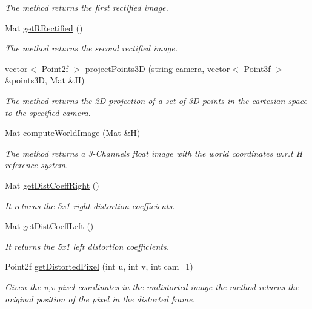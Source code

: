 \begin{DoxyCompactItemize}
\begin{DoxyCompactList}\small\item\em The method returns the first rectified image. \end{DoxyCompactList}\item 
Mat \hyperlink{classStereoCamera_aaf4ba8eaa338ff24db1196849a96e5e9}{get\+R\+Rectified} ()
\begin{DoxyCompactList}\small\item\em The method returns the second rectified image. \end{DoxyCompactList}\item 
vector$<$ Point2f $>$ \hyperlink{classStereoCamera_a03406c9d31c1b765a8d6ef9641222309}{project\+Points3\+D} (string camera, vector$<$ Point3f $>$ \&points3\+D, Mat \&H)
\begin{DoxyCompactList}\small\item\em The method returns the 2\+D projection of a set of 3\+D points in the cartesian space to the specified camera. \end{DoxyCompactList}\item 
Mat \hyperlink{classStereoCamera_a52ef2f3401488e5c4fa6badd1336f96d}{compute\+World\+Image} (Mat \&H)
\begin{DoxyCompactList}\small\item\em The method returns a 3-\/\+Channels float image with the world coordinates w.\+r.\+t H reference system. \end{DoxyCompactList}\item 
Mat \hyperlink{classStereoCamera_a3edeb24b68ee4266f89982533ad1e9bf}{get\+Dist\+Coeff\+Right} ()
\begin{DoxyCompactList}\small\item\em It returns the 5x1 right distortion coefficients. \end{DoxyCompactList}\item 
Mat \hyperlink{classStereoCamera_a4830201154ab288bd93f6cceb2c2daf5}{get\+Dist\+Coeff\+Left} ()
\begin{DoxyCompactList}\small\item\em It returns the 5x1 left distortion coefficients. \end{DoxyCompactList}\item 
Point2f \hyperlink{classStereoCamera_af64550bb8a7a665930dee5eea87b7e47}{get\+Distorted\+Pixel} (int u, int v, int cam=1)
\begin{DoxyCompactList}\small\item\em Given the u,v pixel coordinates in the undistorted image the method returns the original position of the pixel in the distorted frame. \end{DoxyCompactList}\item 

\end{DoxyCompactItemize}
